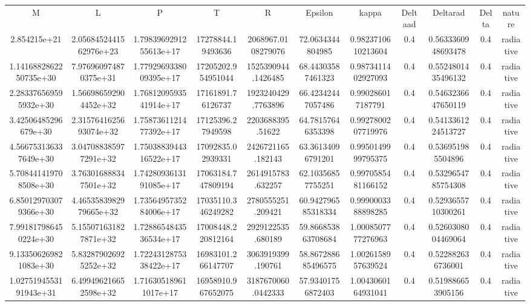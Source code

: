 \begin{table}
\begin{tabular}{ccccccccccc}
M & L & P & T & R & Epsilon & kappa & Deltaad & Deltarad & Delta & nature \\
2.854215e+21 & 2.0568452441562976e+23 & 1.7983969291255613e+17 & 17278844.19493636 & 2068967.0108279076 & 72.0634344804985 & 0.9823710610213604 & 0.4 & 0.5633360948693478 & 0.4 & radiative \\
1.1416882862250735e+30 & 7.976960974870375e+31 & 1.7792969338009395e+17 & 17205202.954951044 & 1525390944.1426485 & 68.44303587461323 & 0.9873411402927093 & 0.4 & 0.5524801435496132 & 0.4 & radiative \\
2.283376569595932e+30 & 1.566986592904452e+32 & 1.7681209593541914e+17 & 17161891.76126737 & 1923240429.7763896 & 66.42342447057486 & 0.990286017187791 & 0.4 & 0.5463236647650119 & 0.4 & radiative \\
3.42506485296679e+30 & 2.3157641625693074e+32 & 1.7587361121477392e+17 & 17125396.27949598 & 2203688395.51622 & 64.78157646353398 & 0.9927800207719976 & 0.4 & 0.5413361224513727 & 0.4 & radiative \\
4.566753136337649e+30 & 3.047088385977291e+32 & 1.7503883944316522e+17 & 17092835.02939331 & 2426721165.182143 & 63.36134096791201 & 0.9950149999795375 & 0.4 & 0.536951985504896 & 0.4 & radiative \\
5.708441419708508e+30 & 3.763016888347501e+32 & 1.7428093613191085e+17 & 17063184.747809194 & 2614915783.632257 & 62.10356857755251 & 0.9970585481166152 & 0.4 & 0.5329654785754308 & 0.4 & radiative \\
6.850129703079366e+30 & 4.4653583982979665e+32 & 1.7356495735284006e+17 & 17035110.346249282 & 2780555251.209421 & 60.942796585318334 & 0.9990003388898285 & 0.4 & 0.5293655710300261 & 0.4 & radiative \\
7.991817986450224e+30 & 5.155071631827871e+32 & 1.7288654843536534e+17 & 17008448.220812164 & 2929122535.680189 & 59.866853863708684 & 1.0008507777276963 & 0.4 & 0.5260308004469064 & 0.4 & radiative \\
9.133506269821083e+30 & 5.832879026925252e+32 & 1.7224312875338422e+17 & 16983101.266147707 & 3063919399.190761 & 58.867288685496575 & 1.0026158957639524 & 0.4 & 0.522882636736001 & 0.4 & radiative \\
1.0275194553191943e+31 & 6.499496216652598e+32 & 1.716305189611017e+17 & 16958910.967652075 & 3187670060.0442333 & 57.93401756872403 & 1.0043060164931041 & 0.4 & 0.519886653905156 & 0.4 & radiative \\

\end{tabular}
\end{table}
